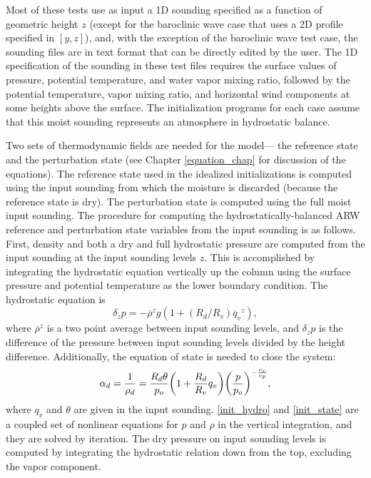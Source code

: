 Most of these tests use as input a 1D sounding specified as a function of
geometric height $z$ (except for the baroclinic wave case that uses a 2D
profile specified in $[y,z]$), and, with the exception of the baroclinic
wave test case, the sounding files are in text format that can be
directly edited by the user.  The 1D specification of the sounding in
these test files requires the surface values of pressure, potential
temperature, and water vapor mixing ratio, followed by the potential
temperature, vapor mixing ratio, and horizontal wind components at some
heights above the surface.  The initialization programs for each case
assume that this moist sounding represents an atmosphere in hydrostatic
balance.

Two sets of thermodynamic fields are needed for the model--- the
reference state and the perturbation state (see Chapter
\ref{equation_chap} for discussion of the equations).  The
reference state used in the idealized initializations is computed using
the input sounding from which the moisture is discarded (because the
reference state is dry).  The perturbation state is computed using the full
moist input sounding.  The procedure for computing the hydrostatically-balanced 
ARW reference and perturbation state variables from the input
sounding is as follows.  First, density and both a dry and full
hydrostatic pressure are computed from the input sounding at the input
sounding levels $z$.  This is accomplished by integrating the
hydrostatic equation vertically up the column using the surface pressure
and potential temperature as the lower boundary condition.  The
hydrostatic equation is
% 
\begin{equation} \delta_z p = - {\overline
\rho}^z g (1 + (R_d/R_v) {\overline q_v}^z), 
\label{init_hydro}
\end{equation} 
% 
\noindent
where $\overline{\rho}^z$ is a two point average between input sounding
levels, and $\delta_z p$ is the difference of the pressure between input
sounding levels divided by the height difference.  Additionally, the
equation of state is needed to close the system:
% 
\begin{equation} \alpha_d = {1 \over \rho_d} = {R_d
\theta \over p_o} \biggl(1 + {R_d \over R_v}q_v\biggr)
\biggl({p \over p_o}\biggr)^{-{c_v \over c_p}}, 
\label{init_state}
\end{equation}
%
\noindent
where $q_v$ and $\theta$ are given in the input sounding.
\eqref{init_hydro} and \eqref{init_state} are a coupled set of nonlinear
equations for $p$ and $\rho$ in the vertical integration, and they are
solved by iteration.  The dry pressure on input sounding levels is
computed by integrating the hydrostatic relation down from the top,
excluding the vapor component.

